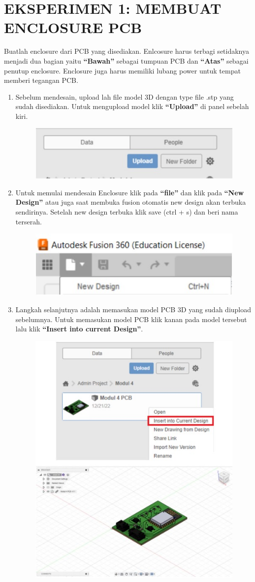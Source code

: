 \section{EKSPERIMEN 1: MEMBUAT ENCLOSURE PCB}
Buatlah enclosure dari PCB yang disediakan. Enlcosure harus terbagi setidaknya menjadi dua bagian yaitu
\textbf{“Bawah”} sebagai tumpuan PCB dan \textbf{“Atas”} sebagai penutup enclosure. Enclosure juga harus memiliki
lubang power untuk tempat memberi tegangan PCB.

\begin{enumerate}
    \item Sebelum mendesain, upload lah file model 3D dengan type file .stp yang sudah disediakan. Untuk
    mengupload model klik \textbf{“Upload”} di panel sebelah kiri.
        \begin{figure}[H]
            \centering
            \includegraphics[width=0.5\linewidth]{P3/img/image3.jpg}
        \end{figure}

    \item Untuk memulai mendesain Enclosure klik pada \textbf{“file”} dan klik pada \textbf{“New Design”} atau juga saat
    membuka fusion otomatis new design akan terbuka sendirinya. Setelah new design terbuka klik
    save (ctrl + s) dan beri nama terserah.
        \begin{figure}[H]
            \centering
            \includegraphics[width=0.5\linewidth]{P3/img/image4.jpg}
        \end{figure}

    \item Langkah selanjutnya adalah memasukan model PCB 3D yang sudah diupload sebelumnya. Untuk
    memasukan model PCB klik kanan pada model tersebut lalu klik \textbf{“Insert into current Design”}.
        \begin{figure}[H]
            \centering
            \includegraphics[width=0.5\linewidth]{P3/img/image5.jpg}
        \end{figure}


\end{enumerate}
